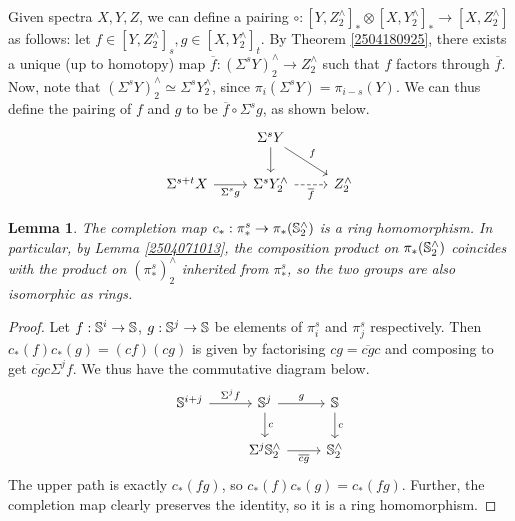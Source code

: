 \documentclass[11pt, titlepage]{article} %
\def\bb{\ensuremath\mathbb}
\numberwithin{equation}{subsection}
\theoremstyle{plain}
\newtheorem{lemma}[theorem]{Lemma}
\theoremstyle{definition}
\begin{document}
Given spectra \(X, Y, Z\), we can define a pairing \(\circ : [Y, Z^\wedge_2]_* \otimes [X,Y^\wedge_2]_* \to [X, Z^\wedge_2]\) as follows: let \(f \in [Y, Z^\wedge_2]_s, g \in [X, Y^\wedge_2]_t\). By Theorem  \ref{2504180925}, there exists a unique (up to homotopy) map \(\overline f : (\Sigma^sY)^\wedge_2 \to Z^\wedge_2\) such that \(f\) factors through \(\overline f\). Now, note that \((\Sigma^sY)^\wedge_2 \simeq \Sigma^sY^\wedge_2\), since \(\pi_i(\Sigma^sY)=\pi_{i-s}(Y)\). We can thus define the pairing of \(f\) and \(g\) to be \(\overline f \circ \Sigma^s g\), as shown below. 
\[\begin{tikzcd}
 & \Sigma^sY \arrow[rd, "f"] \arrow[d, ""] & \\ 
 \Sigma^{s+t}X \arrow[r, swap, "\Sigma^sg"]  & \Sigma^sY^\wedge_2 \arrow[r, "\overline f"', dashrightarrow] & Z^\wedge_2 
 \end{tikzcd}\] 

\begin{lemma}
The completion map \(c_* : \pi_*^s \to \pi_*(\bb{S}^\wedge_2)\) is a ring homomorphism. In particular, by Lemma \ref{2504071013}, the composition product on \(\pi_*(\bb{S}^\wedge_2)\) coincides with the product on \((\pi_*^s)^\wedge_2\) inherited from \(\pi_*^s\), so the two groups are also isomorphic as rings. 
\end{lemma}

\begin{proof}
Let \(f : \bb{S}^i \to \bb{S}\), \(g : \bb{S}^j \to \bb{S}\) be elements of \(\pi_i^s\) and \(\pi_j^s\) respectively. Then \(c_*(f)c_*(g)=(cf)(cg)\) is given by factorising \(cg=\overline{cg}c\) and composing to get \(\overline{cg}c\Sigma^jf\). We thus have the commutative diagram below.
\[\begin{tikzcd}
\bb{S}^{i+j} \arrow[r, "\Sigma^j f"]  & \bb{S}^j \arrow[r, "g"] \arrow[d, "c"] & \bb{S} \arrow[d, "c"] \\ 
 & \Sigma^j \bb{S}^\wedge_2  \arrow[r, "\overline{cg}"'] & \bb{S}^\wedge_2 
 \end{tikzcd}\] 
The upper path is exactly \(c_*(fg)\), so \(c_*(f)c_*(g)=c_*(fg)\). Further, the completion map clearly preserves the identity, so it is a ring homomorphism.
\end{proof}
\end{document}
